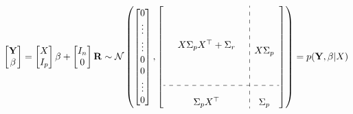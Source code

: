 \begin{gather}
    \begin{bmatrix}
        \mathbf{Y} \\
        \beta
    \end{bmatrix}
    = \begin{bmatrix} X \\ I_p \end{bmatrix} \beta + \begin{bmatrix} I_n \\ 0 \end{bmatrix}  \mathbf{R}
    \sim \N \left(
        \begin{bmatrix}
        0 \\
        \vdots \\
        \vdots \\
        0 \\
        0 \\
        \vdots \\
        0
        \end{bmatrix},
        \left[
        \begin{array}{ c:c c c }
            \begin{matrix}
                & & \\
                & & \\
                & & \\
                & X \Sigma_p X^{\top} + \Sigma_r & \\
                & & \\
                & & \\
                & & \\
            \end{matrix}
            & \begin{matrix} \\ \\ \\ X \Sigma_p  \\ \\ \\ \end{matrix} \\
            \hdashline \\
            \begin{matrix} &  \Sigma_p X^{\top} & \end{matrix} & \Sigma_p
        \end{array}
        \right]
        \right)
    = p(\mathbf{Y}, \beta | X)
\end{gather}

